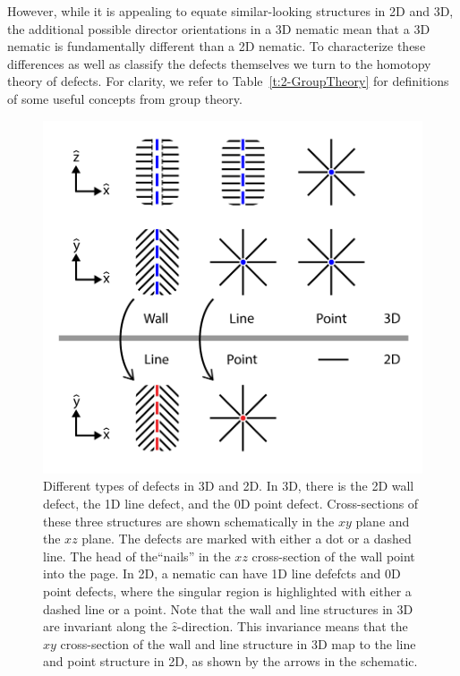 However, while it is appealing to equate similar-looking structures in 2D and 3D, the additional possible director orientations in a 3D nematic mean that a 3D nematic is fundamentally different than a 2D nematic.
To characterize these differences as well as classify the defects themselves we turn to the homotopy theory of defects.
For clarity, we refer to Table~\ref{t:2-GroupTheory} for definitions of some useful concepts from group theory.\\
\begin{figure}[h]
  \centering
  \includegraphics{figures/C2/Ch2-Figs_GenDef.png}
  \caption{Different types of defects in 3D and 2D.
  In 3D, there is the 2D wall defect, the 1D line defect, and the 0D point defect.
  Cross-sections of these three structures are shown schematically in the $xy$ plane and the $xz$ plane.
  The defects are marked with either a dot or a dashed line.
  The head of the``nails'' in the $xz$ cross-section of the wall point into the page.
  In 2D, a nematic can have 1D line defefcts and 0D point defects, where the singular region is highlighted with either a dashed line or a point.
  Note that the wall and line structures in 3D are invariant along the $\hat{z}$-direction.
  This invariance means that the $xy$ cross-section of the wall and line structure in 3D map to the line and point structure in 2D, as shown by the arrows in the schematic.}\label{f:2-GenDef}
\end{figure}

